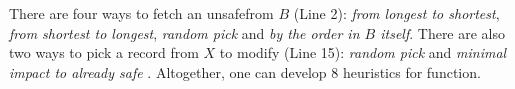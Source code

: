 There are four ways to fetch an unsafe\qid from $B$ (Line 2): 
{\em from longest to shortest}, {\em from shortest to longest}, {\em
random pick} and {\em by the order in $B$ itself}.
There are also two ways to pick a record from $X$ to modify (Line 15): 
{\em random pick} and {\em minimal impact to already safe \qidsx}.
Altogether, one can develop 8 heuristics for \SanitizeBuffer function.


